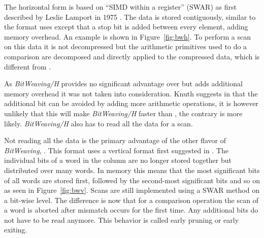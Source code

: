 The horizontal form is based on ``SIMD within a register'' (SWAR) as first
described by Leslie Lamport in 1975 \cite{SWAR}. The data is stored
contiguously, similar to the format \simdscan{} uses except that a stop bit is
added between every element, adding memory overhead. An example is shown in
Figure~\ref{fig:bwh}. To perform a scan on this data it is not decompressed but
the arithmetic primitives used to do a comparison are decomposed and directly
applied to the compressed data, which is different from \simdscan{}.

As \emph{BitWeaving/H} provides no significant advantage over \simdscan{} but
adds additional memory overhead it was not taken into consideration. Knuth
suggests in \cite{SWAR} that the additional bit can be avoided by adding more
arithmetic operations, it is however unlikely that this will make
\emph{BitWeaving/H} faster than \simdscan{}, the contrary is more likely.
\emph{BitWeaving/H} also has to read all the data for a scan.

Not reading all the data is the primary advantage of the other flavor of
\emph{BitWeaving}, \bwv{}. This format uses a vertical format first suggested in
\cite{oneill}. The individual bits of a word in the column are no longer stored
together but distributed over many words. In memory this means that the most
significant bits of all words are stored first, followed by the second-most
significant bits and so on as seen in Figure~\ref{fig:bwv}. Scans are still
implemented using a SWAR method on a bit-wise level. The difference is now that
for a comparison operation the scan of a word is aborted after mismatch occurs
for the first time. Any additional bits do not have to be read anymore. This
behavior is called early pruning or early exiting.

